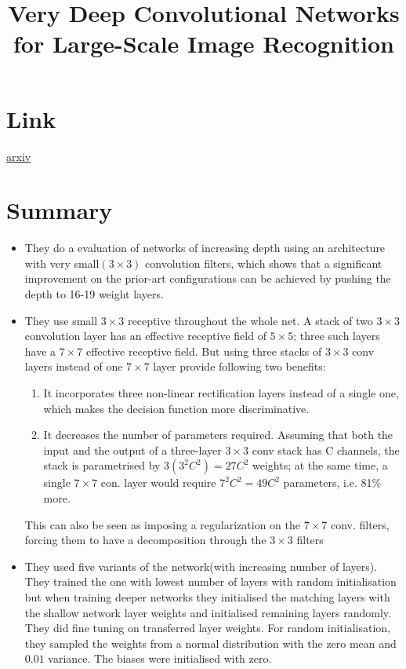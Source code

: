 \documentclass{article}
\title{Very Deep Convolutional Networks for Large-Scale Image Recognition}
\author{}
\date{}
\begin{document}
\maketitle

\section*{Link}
\href{https://arxiv.org/abs/1409.1556}{arxiv} 

\section*{Summary}
\begin{itemize}
    \item They do a evaluation of networks of increasing depth using an architecture with very small$(3\times3)$ convolution filters, which shows that a significant improvement on the prior-art configurations can be achieved by pushing the depth to 16-19 weight layers. 
    \item They use small $3\times3$ receptive throughout the whole net. A stack of two $3\times3$ convolution layer has an effective receptive field of $5\times5$; three such layers have a $7\times7$ effective receptive field. But using three stacks of $3\times3$ conv layers instead of one $7\times7$ layer provide following two benefits:
    \begin{enumerate}
        \item It incorporates three non-linear rectification layers instead of a single one, which makes the decision function more  discriminative.
        \item It decreases the number of parameters required. Assuming that both the input and the output of a three-layer $3\times3$ conv stack has C channels, the stack is parametrised by $3(3^2 C^2) = 27C^2$ weights; at the same time, a single $7\times7$ con. layer would require $7^2C^2=49C^2$ parameters, i.e. 81\% more.
    \end{enumerate}
    This can also be seen as imposing a regularization on the $7\times7$ conv. filters, forcing them to have a decomposition through the $3\times3$ filters
     \item They used five variants of the network(with increasing number of layers). They trained the one with lowest number of layers with random initialisation but when training deeper networks they initialised the matching layers with the shallow network layer weights and initialised remaining layers randomly. They did fine tuning on transferred layer weights. For random initialisation, they sampled the weights from a normal distribution with the zero mean and $0.01$ variance. The biases were initialised with zero. 

\end{itemize}
\end{document}
